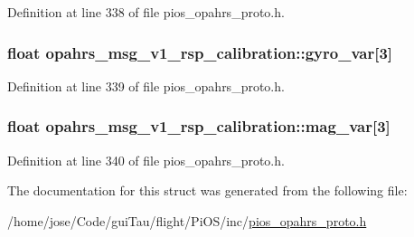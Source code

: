 Definition at line 338 of file pios\-\_\-opahrs\-\_\-proto.\-h.

\hypertarget{structopahrs__msg__v1__rsp__calibration_a1e3d6cc79fdc776ec0f703bf06ae0a39}{
\subsubsection[{gyro\-\_\-var}]{\setlength{\rightskip}{0pt plus 5cm}float opahrs\-\_\-msg\-\_\-v1\-\_\-rsp\-\_\-calibration\-::gyro\-\_\-var\mbox{[}3\mbox{]}}}\label{structopahrs__msg__v1__rsp__calibration_a1e3d6cc79fdc776ec0f703bf06ae0a39}


Definition at line 339 of file pios\-\_\-opahrs\-\_\-proto.\-h.

\hypertarget{structopahrs__msg__v1__rsp__calibration_a5965d2b03e83b6a971450889ba47d4dd}{
\subsubsection[{mag\-\_\-var}]{\setlength{\rightskip}{0pt plus 5cm}float opahrs\-\_\-msg\-\_\-v1\-\_\-rsp\-\_\-calibration\-::mag\-\_\-var\mbox{[}3\mbox{]}}}\label{structopahrs__msg__v1__rsp__calibration_a5965d2b03e83b6a971450889ba47d4dd}


Definition at line 340 of file pios\-\_\-opahrs\-\_\-proto.\-h.



The documentation for this struct was generated from the following file\-:\begin{DoxyCompactItemize}
\item 
/home/jose/\-Code/gui\-Tau/flight/\-Pi\-O\-S/inc/\hyperlink{pios__opahrs__proto_8h}{pios\-\_\-opahrs\-\_\-proto.\-h}\end{DoxyCompactItemize}
